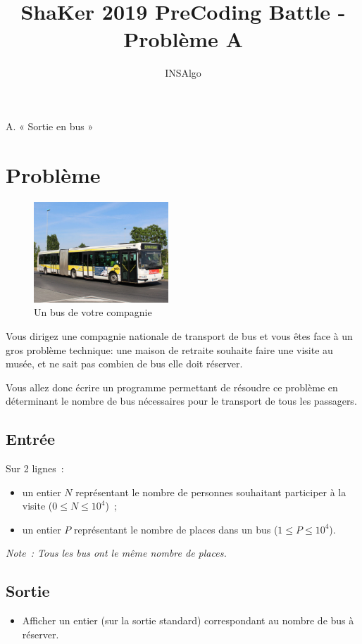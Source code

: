 \documentclass[12pt,a4paper]{report}
\author{INSAlgo}
\title{ShaKer 2019 PreCoding Battle - Problème A}
\begin{document}
\begin{center}
	{\Large A. « Sortie en bus »}
	\bigskip
\end{center}

\section*{Problème}

\begin{figure}
    \centering
    \captionsetup{justification=centering}
    \includegraphics[width=0.45\textwidth]{bus.jpg}
    \caption*{Un bus de votre compagnie}
\end{figure}
Vous dirigez une compagnie nationale de transport de bus et vous êtes face à un gros problème technique: une maison de retraite souhaite faire une visite au musée, et ne sait pas combien de bus elle doit réserver. 

Vous allez donc écrire un programme permettant de résoudre ce problème en déterminant le nombre de bus nécessaires pour le transport de tous les passagers. \\


\subsection*{Entrée}%
Sur 2 lignes~:
\begin{itemize}
\item un entier $N$ représentant le nombre de personnes souhaitant participer à la visite ($0 \leq N \leq 10^{4}$)~;
\item un entier $P$ représentant le nombre de places dans un bus ($1 \leq P \leq 10^{4}$).
\end{itemize}
\textit{Note~: Tous les bus ont le même nombre de places.}

\subsection*{Sortie}
\begin{itemize} %
\item Afficher un entier (sur la sortie standard) correspondant au nombre de bus à réserver.
\end{itemize}
\end{document}

